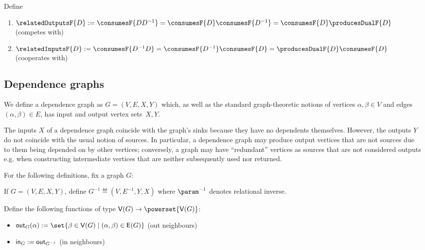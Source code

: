 \begin{definition}
   Define
   \begin{enumerate}
      \item $\relatedOutputsF{D} \eqdef \consumesF{DD^{-1}} = \consumesF{D}\consumesF{D^{-1}} = \consumesF{D}\producesDualF{D}$ \hfill (competes with)
      \item $\relatedInputsF{D} \eqdef \consumesF{D^{-1}D} = \consumesF{D^{-1}}\consumesF{D} = \producesDualF{D}\consumesF{D}$ \hfill (cooperates with)
   \end{enumerate}
\end{definition}

\subsection{Dependence graphs}

We define a dependence graph as $G = (V, E, X, Y)$ which, as well as the standard graph-theoretic notions of vertices $\alpha, \beta \in V$ and edges $(\alpha, \beta) \in E$, has input and output vertex sets~$X, Y$.

The inputs $X$ of a dependence graph coincide with the graph's sinks because they have no dependents themselves. However, the outputs $Y$  do not coincide with the usual notion of sources. In particular, a dependence graph may produce output vertices that are not sources due to them being depended on by other vertices; conversely, a graph may have  ``redundant'' vertices as sources that are not considered outputs e.g. when constructing intermediate vertices that are neither subsequently used nor returned.

For the following definitions, fix a graph $G$:


\begin{definition}
   If $G = (V,E, X, Y)$, define $G^{-1} \eqdef (V, E^{-1}, Y, X)$ where $\param^{-1}$ denotes relational inverse.
\end{definition}

\begin{definition}[Neighbours]
   Define the following functions of type $\V(G) \to \powerset{\V(G)}$:
   \begin{itemize}
      \item $\outN{G}(\alpha) \eqdef \set{\beta \in \V(G) \mid (\alpha, \beta) \in \E(G)}$ \hfill (out neighbours)
      \item $\textup{\textsf{in}}_{G} := \textup{\textsf{out}}_{G^{-1}}$ \hfill (in neighbours)
   \end{itemize}
\end{definition}

